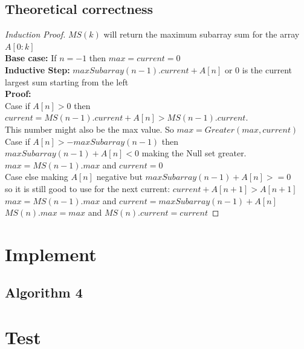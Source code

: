 \documentclass[a4paper,10pt]{article}
\begin{document}
\begin{samepage} 
	\section{Theoretical correctness}
		\begin{proof}[Induction Proof]
			$MS(k)$ will return the maximum subarray sum for the array $A[0:k]$\\
			\textbf{Base case:} If $n = -1$ then $max = current = 0$\\
			\textbf{Inductive Step:} $maxSubarray(n-1).current + A[n]$ or 0 is the current largest sum starting from the left\\
			\textbf{Proof:}\\ 
			Case if $A[n] > 0$ then $current = MS(n-1).current + A[n] > MS(n-1).current$. \\
			\indent This number might also be the max value. So $max = Greater(max,current)$\\
			Case if $A[n] >  - maxSubarray(n-1)$ then $maxSubarray(n-1) + A[n] < 0$ making the Null set greater.\\
			\indent $max = MS(n-1).max$ and $current = 0$ \\
			Case else making $A[n]$ negative but $maxSubarray(n-1) + A[n] >= 0$\\
			\indent so it is still good to use for the next current: $current + A[n+1] > A[n+1]$\\
			\indent $max = MS(n-1).max$ and $current = maxSubarray(n-1) + A[n]$\\
			$MS(n).max = max$ and $MS(n).current = current$
			 
		\end{proof}
\end{samepage} 
	\section{Implement}
		\subsection{Algorithm 4}
		
	\section{Test}
\end{document}
